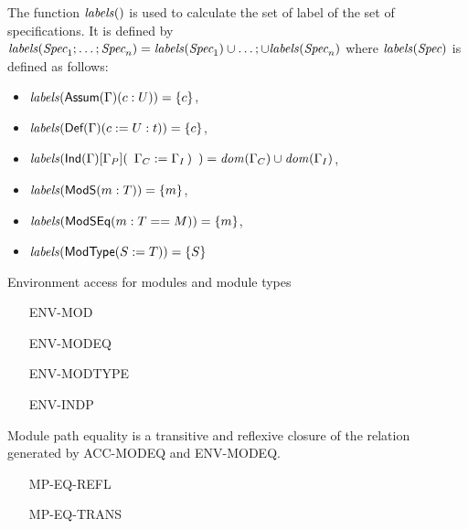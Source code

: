 The function $\mathit{labels}()$ is used to calculate the set of label of
the set of specifications. It is defined by
$\mathit{labels}(\textit{Spec}_1;\dots;\textit{Spec}_n)=\mathit{labels}(\textit{Spec}_1)\cup\dots;\cup\mathit{labels}(\textit{Spec}_n)$
where $\mathit{labels}(\textit{Spec})$ is defined as follows:
\begin{itemize}
\item $\mathit{labels}(\mbox{{\sf Assum}$(\Gamma)(c:U)$})=\{c\}$,
\item $\mathit{labels}(\mbox{{\sf Def}$(\Gamma)(c:=U:t)$})=\{c\}$,
\item
  $\mathit{labels}(\mbox{{\sf Ind}$(\Gamma)[\Gamma_P](\begin{array}[t]{l}\Gamma_C:=\Gamma_I \,)\end{array}$})=\mathit{dom}(\Gamma_C)\cup\mathit{dom}(\Gamma_I)$,
\item $\mathit{labels}({\sf ModS}({m}:{T}))=\{m\}$,
\item $\mathit{labels}({\sf ModSEq}({m}:{T}=={M}))=\{m\}$,
\item $\mathit{labels}({\sf ModType}({S}:={T}))=\{S\}$
\end{itemize}
Environment access for modules and module types
\begin{itemize}
\item [ENV-MOD]
\item []
\item [ENV-MODEQ]
\item [ENV-MODTYPE]
\item [ENV-INDP]
\end{itemize}
Module path equality is a transitive and reflexive closure of the
relation generated by ACC-MODEQ and ENV-MODEQ.
\begin{itemize}
\item [MP-EQ-REFL]
\item [MP-EQ-TRANS]

\end{itemize}




